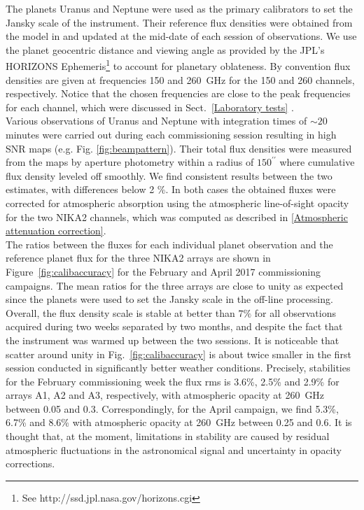 \documentclass[]{aa} %
\begin{document}
The planets Uranus and Neptune  were used as the primary calibrators to set the Jansky scale of the instrument. Their reference flux densities were obtained from the model in \cite{moreno2010} and updated at the mid-date of each session of observations. We use the planet geocentric distance and viewing angle as provided by the JPL's HORIZONS Ephemeris\footnote{See http://ssd.jpl.nasa.gov/horizons.cgi} to account for planetary oblateness. By convention flux densities are given at frequencies 150 and 260~GHz for the 150 and 260 channels, respectively. Notice that the chosen frequencies are close to the peak frequencies for each channel, which were discussed in Sect.~\ref{Laboratory tests} . \\

Various observations of Uranus and Neptune with integration times of $\sim 20$ minutes were carried out during each commissioning session resulting in high SNR maps (e.g. Fig. \ref{fig:beampattern}). Their total flux densities were measured from the maps 
by aperture photometry within a radius of  $150^{\prime \prime}$ where cumulative flux density leveled off smoothly. We find consistent results between the two estimates, with differences below 2 \%. In both cases the obtained fluxes were corrected for atmospheric absorption using the atmospheric line-of-sight opacity for the two NIKA2 channels, which was computed as described in \ref{Atmospheric attenuation correction}. \\

The ratios between the fluxes for each individual planet observation and the reference planet flux for the three NIKA2 arrays are shown in Figure~\ref{fig:calibaccuracy} for the February and April 2017 commissioning campaigns.  The mean ratios for the three arrays are close to unity as expected since the planets were used to set the Jansky scale in the off-line processing. Overall, the flux density scale is stable at better than $7\%$ for all observations acquired during two weeks  separated by two months, and despite the fact that the instrument was warmed up between the two sessions. It is noticeable that scatter around unity in Fig.~\ref{fig:calibaccuracy}
is about twice smaller in the first session conducted in significantly better weather conditions.
Precisely, stabilities for the February commissioning week the flux rms is 3.6\%, 2.5\% and 2.9\% for arrays A1, A2 and A3, respectively, with atmospheric opacity at 260~GHz between 0.05 and 0.3. Correspondingly, for the April campaign, we find  5.3\%, 6.7\% and 8.6\%  with atmospheric opacity at 260~GHz between 0.25 and 0.6. It is thought that, at the moment, limitations in stability are caused by residual atmospheric fluctuations in the astronomical signal and uncertainty in opacity corrections. 
\end{document}
